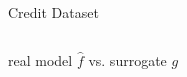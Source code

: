 \documentclass[aspectratio=169]{../latex_main/tntbeamer}  %
\begin{document}
\begin{frame}{Credit Dataset}
\begin{columns}
\begin{column}{0.35\textwidth}
\begin{center}
		\end{center}
			
	\end{column}
\end{columns}
\begin{center}
    real model $\hat{f}$ vs. surrogate $g$
\end{center}

\end{frame}

%
%
%
\end{document}

